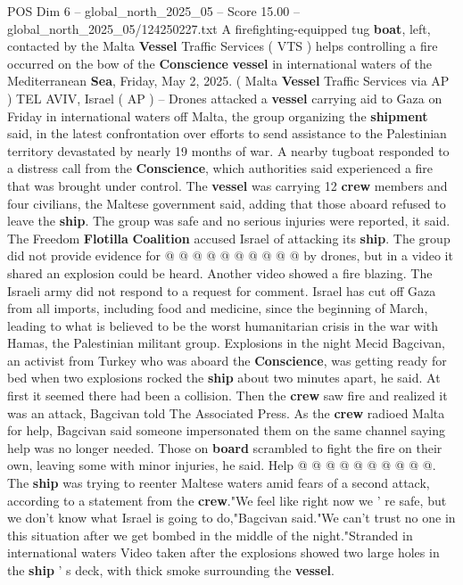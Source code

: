 \begin{textsample}{POS Dim 6 – global\_north\_2025\_05 – Score 15.00 – global\_north\_2025\_05/124250227.txt}  \label{ex:f6_pos_042}
A firefighting-equipped tug \textbf{boat}, left, contacted by the Malta \textbf{Vessel} Traffic Services ( VTS ) helps controlling a fire occurred on the bow of the \textbf{Conscience} \textbf{vessel} in international waters of the Mediterranean \textbf{Sea}, Friday, May 2, 2025. ( Malta \textbf{Vessel} Traffic Services via AP ) TEL AVIV, Israel ( AP ) -- Drones attacked a \textbf{vessel} carrying aid to Gaza on Friday in international waters off Malta, the group organizing the \textbf{shipment} said, in the latest confrontation over efforts to send assistance to the Palestinian territory devastated by nearly 19 months of war.
A nearby tugboat responded to a distress call from the \textbf{Conscience}, which authorities said experienced a fire that was brought under control.
The \textbf{vessel} was carrying 12 \textbf{crew} members and four civilians, the Maltese government said, adding that those aboard refused to leave the \textbf{ship}.
The group was safe and no serious injuries were reported, it said.
The Freedom \textbf{Flotilla} \textbf{Coalition} accused Israel of attacking its \textbf{ship}.
The group did not provide evidence for @ @ @ @ @ @ @ @ @ @ by drones, but in a video it shared an explosion could be heard.
Another video showed a fire blazing.
The Israeli army did not respond to a request for comment.
Israel has cut off Gaza from all imports, including food and medicine, since the beginning of March, leading to what is believed to be the worst humanitarian crisis in the war with Hamas, the Palestinian militant group.
Explosions in the night Mecid Bagcivan, an activist from Turkey who was aboard the \textbf{Conscience}, was getting ready for bed when two explosions rocked the \textbf{ship} about two minutes apart, he said.
At first it seemed there had been a collision.
Then the \textbf{crew} saw fire and realized it was an attack, Bagcivan told The Associated Press.
As the \textbf{crew} radioed Malta for help, Bagcivan said someone impersonated them on the same channel saying help was no longer needed.
Those on \textbf{board} scrambled to fight the fire on their own, leaving some with minor injuries, he said.
Help @ @ @ @ @ @ @ @ @ @.
The \textbf{ship} was trying to reenter Maltese waters amid fears of a second attack, according to a statement from the \textbf{crew}."We feel like right now we ' re safe, but we don't know what Israel is going to do,"Bagcivan said."We can't trust no one in this situation after we get bombed in the middle of the night."Stranded in international waters Video taken after the explosions showed two large holes in the \textbf{ship} ' s deck, with thick smoke surrounding the \textbf{vessel}.

\end{textsample}
